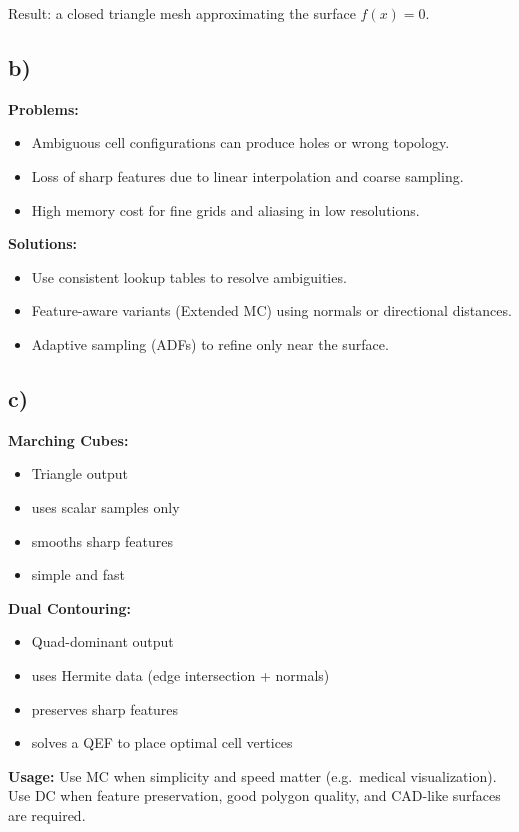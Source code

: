 \documentclass{article}
\begin{document}
Result: a closed triangle mesh approximating the surface $f(x)=0$.

\subsection*{b)}
\textbf{Problems:}
\begin{itemize}
	\item Ambiguous cell configurations can produce holes or wrong topology.  
	\item Loss of sharp features due to linear interpolation and coarse sampling.  
	\item High memory cost for fine grids and aliasing in low resolutions.  
\end{itemize}
\textbf{Solutions:}
\begin{itemize}
	\item Use consistent lookup tables to resolve ambiguities.  
	\item Feature-aware variants (Extended MC) using normals or directional distances.  
	\item Adaptive sampling (ADFs) to refine only near the surface.  
\end{itemize}

\subsection*{c)}
\textbf{Marching Cubes:}
\begin{itemize}
	\item Triangle output
	\item uses scalar samples only
	\item smooths sharp features
	\item simple and fast
\end{itemize}
\textbf{Dual Contouring:}
\begin{itemize}
	\item Quad-dominant output
	\item uses Hermite data (edge intersection + normals)
	\item preserves sharp features
	\item solves a QEF to place optimal cell vertices
\end{itemize}
\textbf{Usage:}
Use MC when simplicity and speed matter (e.g.\ medical visualization).  
Use DC when feature preservation, good polygon quality, and CAD-like surfaces are required.
\end{document}
